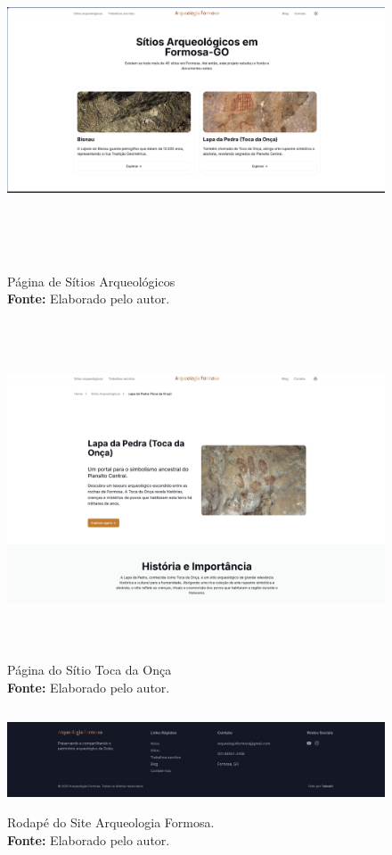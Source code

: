 \begin{figure}[H]
    \centering
    \includegraphics[height=10cm, keepaspectratio]{img/site/sitios arqueologicos.png}
    \caption{Página de Sítios Arqueológicos \\
    \textbf{Fonte:} Elaborado pelo autor.}
    \label{fig:pagina_sitiosarqueologicos}
\end{figure}



\begin{figure}[H]
    \centering
    \includegraphics[height=10cm, keepaspectratio]{img/site/pagina_toca_da_onca.png}
    \caption{Página do Sítio Toca da Onça \\
    \textbf{Fonte:} Elaborado pelo autor.}
    \label{fig:pagina_tocadaonca}
\end{figure}


\begin{figure}[H]
    \centering
    \includegraphics[height=3cm, keepaspectratio]{img/site/footer.png}
    \caption{Rodapé do Site Arqueologia Formosa. \\
    \textbf{Fonte:} Elaborado pelo autor.}
    \label{fig:footer}
\end{figure}

